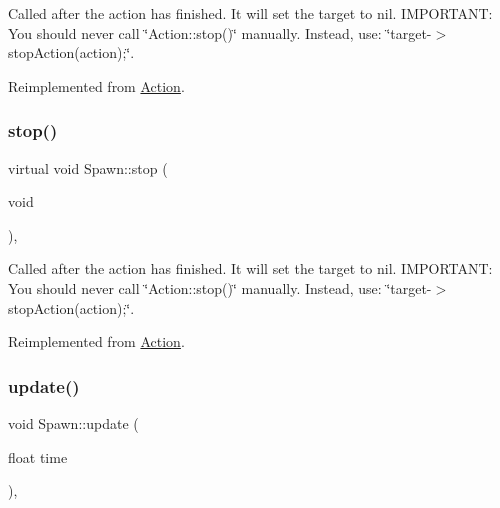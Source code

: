 Called after the action has finished. It will set the \textquotesingle{}target\textquotesingle{} to nil. I\+M\+P\+O\+R\+T\+A\+NT\+: You should never call \char`\"{}\+Action\+::stop()\char`\"{} manually. Instead, use\+: \char`\"{}target-\/$>$stop\+Action(action);\char`\"{}. 

Reimplemented from \hyperlink{classAction_a968267fa7a1dcc46a2976249a712d3c8}{Action}.

\mbox{\label{classSpawn_a6b4b872928f24b722fda9d7428178a56}} 
\subsubsection{\texorpdfstring{stop()}{stop()}\hspace{0.1cm}{\footnotesize\ttfamily [2/2]}}
{\footnotesize\ttfamily virtual void Spawn\+::stop (\begin{DoxyParamCaption}\item[{void}]{ }\end{DoxyParamCaption})\hspace{0.3cm}{\ttfamily [override]}, {\ttfamily [virtual]}}

Called after the action has finished. It will set the \textquotesingle{}target\textquotesingle{} to nil. I\+M\+P\+O\+R\+T\+A\+NT\+: You should never call \char`\"{}\+Action\+::stop()\char`\"{} manually. Instead, use\+: \char`\"{}target-\/$>$stop\+Action(action);\char`\"{}. 

Reimplemented from \hyperlink{classAction_a968267fa7a1dcc46a2976249a712d3c8}{Action}.

\mbox{\label{classSpawn_a31d8a91378f9ebe0c639fa63a999c34e}} 
\subsubsection{\texorpdfstring{update()}{update()}\hspace{0.1cm}{\footnotesize\ttfamily [1/2]}}
{\footnotesize\ttfamily void Spawn\+::update (\begin{DoxyParamCaption}\item[{float}]{time }\end{DoxyParamCaption})\hspace{0.3cm}{\ttfamily [override]}, {\ttfamily [virtual]}}


